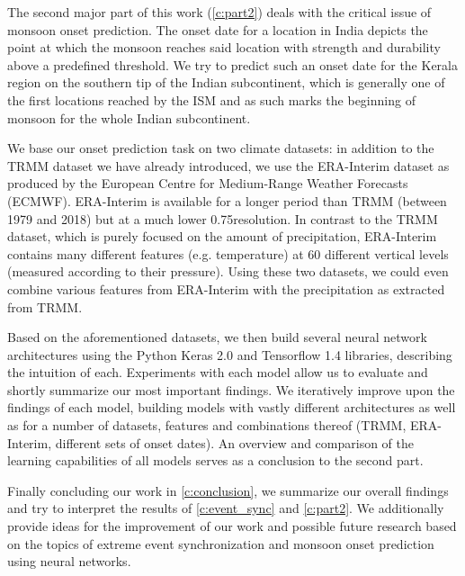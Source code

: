 The second major part of this work (\cref{c:part2}) deals with the critical issue of monsoon onset prediction. The onset date for a location in India depicts the point at which the monsoon reaches said location with strength and durability above a predefined threshold. We try to predict such an onset date for the Kerala region on the southern tip of the Indian subcontinent, which is generally one of the first locations reached by the ISM and as such marks the beginning of monsoon for the whole Indian subcontinent.

We base our onset prediction task on two climate datasets: in addition to the TRMM dataset we have already introduced, we use the ERA-Interim dataset as produced by the European Centre for Medium-Range Weather Forecasts (ECMWF). ERA-Interim is available for a longer period than TRMM (between 1979 and 2018) but at a much lower 0.75\degree resolution. In contrast to the TRMM dataset, which is purely focused on the amount of precipitation, ERA-Interim contains many different features (e.g. temperature) at 60 different vertical levels (measured according to their pressure). Using these two datasets, we could even combine various features from ERA-Interim with the precipitation as extracted from TRMM.

Based on the aforementioned datasets, we then build several neural network architectures using the Python Keras 2.0 and Tensorflow 1.4 libraries, describing the intuition of each. Experiments with each model allow us to evaluate and shortly summarize our most important findings. We iteratively improve upon the findings of each model, building models with vastly different architectures as well as for a number of datasets, features and combinations thereof (TRMM, ERA-Interim, different sets of onset dates). An overview and comparison of the learning capabilities of all models serves as a conclusion to the second part.

Finally concluding our work in \cref{c:conclusion}, we summarize our overall findings and try to interpret the results of \cref{c:event_sync} and \cref{c:part2}. We additionally provide ideas for the improvement of our work and possible future research based on the topics of extreme event synchronization and monsoon onset prediction using neural networks.
